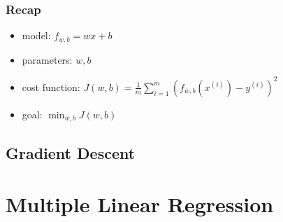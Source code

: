 \documentclass[a4paper]{article}
\begin{document}
\subsubsection{Recap}
\begin{itemize}
    \item model: \(f_{w,b} = wx + b\)
    \item parameters: \(w,b\)
    \item cost function: \(J\left(w, b\right) = \frac{1}{m}\sum_{i = 1}^{m}\left(f_{w,b}\left(x^{(i)}\right) - y^{(i)}\right)^2\)
    \item goal: \(\displaystyle \min_{w,b} J\left(w,b\right)\)
\end{itemize}
\subsection{Gradient Descent}
\noindent
\section{Multiple Linear Regression}
 
\end{document}
